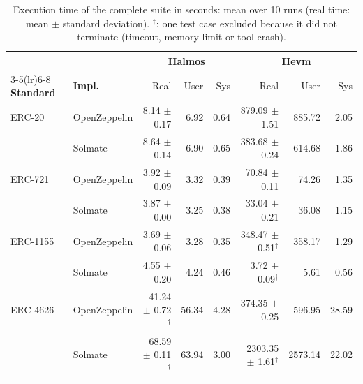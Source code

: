 \begin{table}[htbp]
\centering
\begin{scriptsize}
\begin{tabular}{llrrrrrr}
\toprule
 & & \multicolumn{3}{c}{\textbf{Halmos}} & \multicolumn{3}{c}{\textbf{Hevm}} \\
\cmidrule(lr){3-5}\cmidrule(lr){6-8}
\textbf{Standard} & \textbf{Impl.} & Real & User & Sys & Real & User & Sys \\
\midrule
ERC-20 & OpenZeppelin & 8.14 $\pm$ 0.17 & 6.92 & 0.64 & 879.09 $\pm$ 1.51 & 885.72 & 2.05 \\
 & Solmate & 8.64 $\pm$ 0.14 & 6.90 & 0.65 & 383.68 $\pm$ 0.24 & 614.68 & 1.86 \\
\addlinespace
ERC-721 & OpenZeppelin & 3.92 $\pm$ 0.09 & 3.32 & 0.39 & 70.84 $\pm$ 0.11 & 74.26 & 1.35 \\
 & Solmate & 3.87 $\pm$ 0.00 & 3.25 & 0.38 & 33.04 $\pm$ 0.21 & 36.08 & 1.15 \\
\addlinespace
ERC-1155 & OpenZeppelin & 3.69 $\pm$ 0.06 & 3.28 & 0.35 & 348.47 $\pm$ 0.51$^{\dagger}$ & 358.17 & 1.29 \\
 & Solmate & 4.55 $\pm$ 0.20 & 4.24 & 0.46 & 3.72 $\pm$ 0.09$^{\dagger}$ & 5.61 & 0.56 \\
\addlinespace
ERC-4626 & OpenZeppelin & 41.24 $\pm$ 0.72$^{\dagger}$ & 56.34 & 4.28 & 374.35 $\pm$ 0.25 & 596.95 & 28.59 \\
 & Solmate & 68.59 $\pm$ 0.11$^{\dagger}$ & 63.94 & 3.00 & 2303.35 $\pm$ 1.61$^{\dagger}$ & 2573.14 & 22.02 \\
\bottomrule
\end{tabular}
\end{scriptsize}
\caption{Execution time of the complete suite in seconds: mean over 10 runs (real time: mean $\pm$ standard deviation). $^{\dagger}$: one test case excluded because it did not terminate (timeout, memory limit or tool crash).}
\label{tab:time_all}
\end{table}

